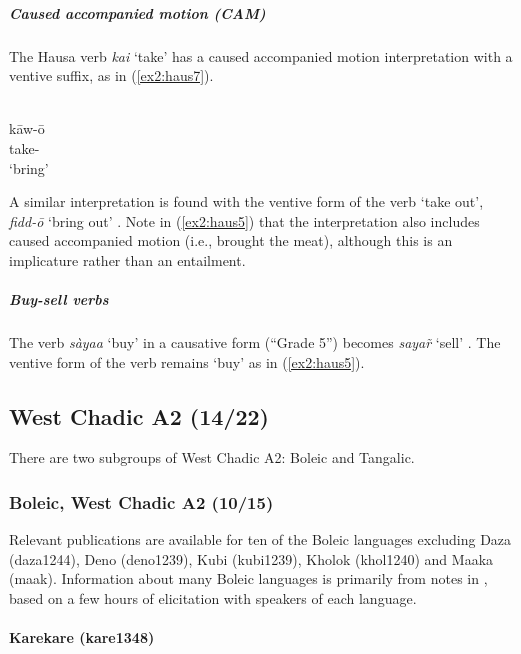 \subparagraph{Caused accompanied motion (CAM)}



The Hausa verb \textit{kai} `take' has a caused accompanied motion interpretation with a ventive suffix, as in (\ref{ex2:haus7}). 

\ea\label{ex2:haus7}
 \\
\gll kāw-ō \\
take- \\
\glt `bring'
\z 

A similar interpretation is found with the ventive form of the verb `take out', \textit{fidd-ō} `bring out' \citep[664]{newmanHausaLanguageEncyclopedic2000}. Note in (\ref{ex2:haus5}) that the interpretation also includes caused accompanied motion (i.e., brought the meat), although this is an implicature rather than an entailment. 

\subparagraph{Buy-sell verbs}



	The verb \textit{sàyaa} `buy' in a causative form (``Grade 5'') becomes \textit{sayar̃} `sell' \citep[][]{jaggarHausaGrade52014}. The ventive form of the verb remains `buy' as in (\ref{ex2:haus5}).

\subsection{West Chadic A2 (14/22)}

There are two subgroups of West Chadic A2: Boleic and Tangalic.

\subsubsection{Boleic, West Chadic A2 (10/15)}


Relevant publications are available for ten of the Boleic languages excluding Daza (daza1244),
Deno (deno1239),
Kubi (kubi1239),
Kholok (khol1240)
and Maaka (maak). Information about many Boleic languages is primarily from notes in \citet{schuhBoleTangaleLanguagesBauchi1978}, based on a few hours of elicitation with speakers of each language.

\paragraph*{Karekare (kare1348)} \label{kare} 

